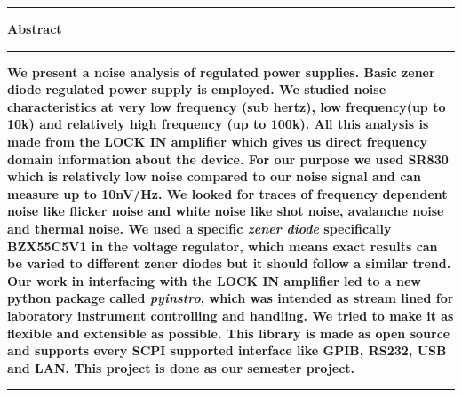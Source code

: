 \begin{table}[hbt!]\centering
  \parbox[h]{.75\textwidth}{\centering \hrule height 2pt \vskip10pt\Large \textbf{Abstract} \vskip10pt \hrule height 2pt \vskip10pt}
  \parbox[h]{.75\textwidth}{\normalsize \textbf{
       We present a noise analysis of regulated power supplies. Basic zener diode regulated power supply is employed. We studied noise characteristics at very low frequency (sub hertz), low frequency(up to 10k) and relatively high frequency (up to 100k). All this analysis is made from the LOCK IN amplifier which gives us direct frequency domain information about the device. For our purpose we used SR830 which is relatively low noise compared to our noise signal and can measure up to 10nV/Hz. We looked for traces of frequency dependent noise like flicker noise and  white noise like shot noise, avalanche noise and thermal noise. We used a specific \emph{zener diode} specifically BZX55C5V1 in the voltage regulator, which means exact results can be varied to different zener diodes but it should follow a similar trend. Our work in interfacing with the LOCK IN amplifier led to a new python package called \emph{pyinstro}, which was intended as stream lined for laboratory instrument controlling and handling. We tried to make it as flexible and extensible as possible. This library is made as open source and supports every SCPI supported interface like GPIB, RS232, USB and LAN.  This project is done as our semester project. 
} \vskip10pt \hrule height 2pt \vskip10pt}
\end{table}
\clearpage
\begin{table}[hbt!]\centering
\vskip100pt
\parbox[h]{.75\textwidth}{\tableofcontents}
\end{table}
\clearpage
